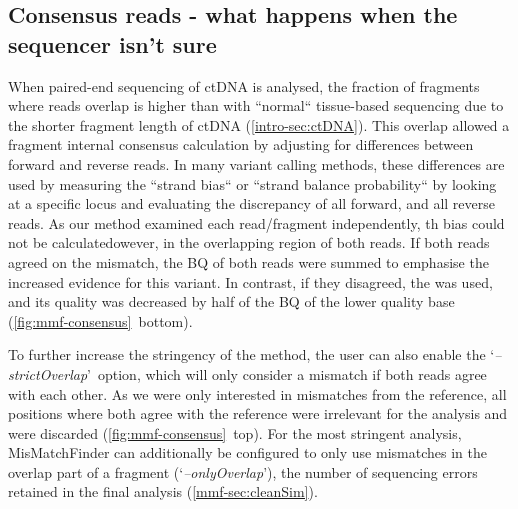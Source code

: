\subsection[Consensus reads]{Consensus reads - what happens when the sequencer isn't sure}
\label{mmf-sec:consensus}

When paired-end sequencing of ctDNA is analysed, the fraction of fragments where reads overlap is higher than with ``normal`` tissue-based sequencing due to the shorter fragment length of ctDNA (\autoref{intro-sec:ctDNA}). This overlap allowed a fragment internal consensus calculation by adjusting for differences between forward and reverse reads. In many variant calling methods, these differences are used by measuring the ``strand bias`` \cite{Guo2012, Saunders2012, GATKTeam2019} or ``strand balance probability`` \cite{Garrison2012} by looking at a specific locus and evaluating the discrepancy of all forward, and all reverse reads. As our method examined each read/fragment independently, th bias could not be calculatedowever, in the overlapping region of both reads. If both reads agreed on the mismatch, the BQ of both reads were summed to emphasise the increased evidence for this variant. In contrast, if they disagreed, the  was used, and its quality was decreased by half of the BQ of the lower quality base (\autoref{fig:mmf-consensus}~bottom). \cite{Magoc2011}\cite{Zhang2013} 

To further increase the stringency of the method, the user can also enable the \lq\emph{--strictOverlap}\rq\ option, which will only consider a mismatch if both reads agree with each other. As we were only interested in mismatches from the reference, all positions where both agree with the reference were irrelevant for the analysis and were discarded (\autoref{fig:mmf-consensus}~top). For the most stringent analysis, MisMatchFinder can additionally be configured to only use mismatches in the overlap part of a fragment (\lq\emph{--onlyOverlap}\rq),  the number of sequencing errors  retained in the final analysis (\autoref{mmf-sec:cleanSim}).

